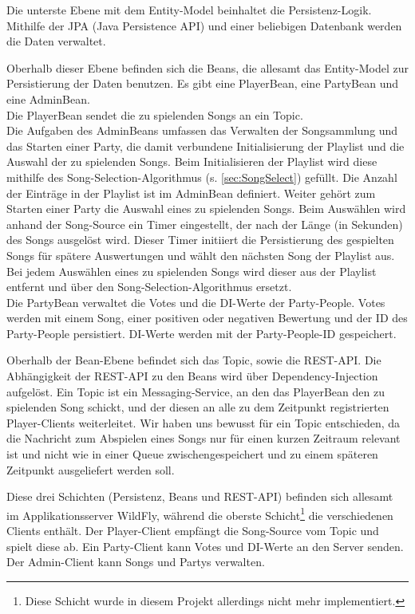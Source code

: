 Die unterste Ebene mit dem Entity-Model beinhaltet die Persistenz-Logik. Mithilfe der JPA (Java Persistence API) und einer beliebigen Datenbank werden die Daten verwaltet.

Oberhalb dieser Ebene befinden sich die Beans, die allesamt das Entity-Model zur Persistierung der Daten benutzen. Es gibt eine PlayerBean, eine PartyBean und eine AdminBean.\\
Die PlayerBean sendet die zu spielenden Songs an ein Topic.\\ 
Die Aufgaben des AdminBeans umfassen das Verwalten der Songsammlung und das Starten einer Party, die damit verbundene Initialisierung der Playlist und die Auswahl der zu spielenden Songs. Beim Initialisieren der Playlist wird diese mithilfe des Song-Selection-Algorithmus (s. \ref{sec:SongSelect}) gefüllt. Die Anzahl der Einträge in der Playlist ist im AdminBean definiert. Weiter gehört zum Starten einer Party die Auswahl eines zu spielenden Songs. Beim Auswählen wird anhand der Song-Source ein Timer eingestellt, der nach der Länge (in Sekunden) des Songs ausgelöst wird. Dieser Timer initiiert die Persistierung des gespielten Songs für spätere Auswertungen und wählt den nächsten Song der Playlist aus. Bei jedem Auswählen eines zu spielenden Songs wird dieser aus der Playlist entfernt und über den Song-Selection-Algorithmus ersetzt.\\
Die PartyBean verwaltet die Votes und die DI-Werte der Party-People. Votes werden mit einem Song, einer positiven oder negativen Bewertung und der ID des Party-People persistiert. DI-Werte werden mit der Party-People-ID gespeichert.

Oberhalb der Bean-Ebene befindet sich das Topic, sowie die REST-API. Die Abhängigkeit der REST-API zu den Beans wird über Dependency-Injection aufgelöst. Ein Topic ist ein Messaging-Service, an den das PlayerBean den zu spielenden Song schickt, und der diesen an alle zu dem Zeitpunkt registrierten Player-Clients weiterleitet. Wir haben uns bewusst für ein Topic entschieden, da die Nachricht zum Abspielen eines Songs nur für einen kurzen Zeitraum relevant ist und nicht wie in einer Queue zwischengespeichert und zu einem späteren Zeitpunkt ausgeliefert werden soll.

Diese drei Schichten (Persistenz, Beans und REST-API) befinden sich allesamt im Applikationsserver WildFly, während die oberste Schicht\footnote{Diese Schicht wurde in diesem Projekt allerdings nicht mehr implementiert.} die verschiedenen Clients enthält. Der Player-Client empfängt die Song-Source vom Topic und spielt diese ab. Ein Party-Client kann Votes und DI-Werte an den Server senden. Der Admin-Client kann Songs und Partys verwalten.

